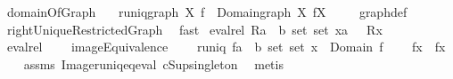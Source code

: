 \begin{isabellebody}
%
\endisadelimproof
\isanewline
{}\isamarkupfalse%
\ domainOfGraph{\isacharcolon}\ \isanewline
\ \ {\isachardoublequoteopen}runiq{\isacharparenleft}graph\ X\ f{\isacharparenright}\ {\isacharampersand}\ Domain{\isacharparenleft}graph\ X\ f{\isacharparenright}{\isacharequal}X{\isachardoublequoteclose}\ \isanewline
%
\isadelimproof
\ \ %
\endisadelimproof
%
\isatagproof
{}\isamarkupfalse%
\ graph{\isacharunderscore}def\ \isanewline
\ \ \isamarkupfalse%
\ rightUniqueRestrictedGraph\ \isamarkupfalse%
\ fast%
\endisatagproof
{\isafoldproof}%
%
\isadelimproof
\isanewline
%
\endisadelimproof
\isanewline
\isanewline
{}\isamarkupfalse%
\ {\isachardoublequoteopen}eval{\isacharunderscore}rel{}\ {\isacharparenleft}R{\isacharcolon}{\isacharcolon}{\isacharparenleft}{\isacharprime}a\ {\isasymtimes}\ {\isacharparenleft}{\isacharprime}b\ set{\isacharparenright}{\isacharparenright}\ set{\isacharparenright}\ {\isacharparenleft}x{\isacharcolon}{\isacharcolon}{\isacharprime}a{\isacharparenright}\ {\isacharequal}{\isacharequal}\ {\isasymUnion}\ {\isacharparenleft}R{\isacharbackquote}{\isacharbackquote}{\isacharbraceleft}x{\isacharbraceright}{\isacharparenright}{\isachardoublequoteclose}\isanewline
\ \ \isamarkupfalse%
\ eval{\isacharunderscore}rel{}\ {\isacharparenleft}\ {\isachardoublequoteopen}{\isacharcomma}{\isacharcomma}{\isacharcomma}{\isachardoublequoteclose}\ {}{}{\isacharparenright}\isanewline
\isanewline
{}\isamarkupfalse%
\ imageEquivalence{\isacharcolon}\ \isanewline
\ \ \ {\isachardoublequoteopen}runiq\ {\isacharparenleft}f{\isacharcolon}{\isacharcolon}{\isacharparenleft}{\isacharparenleft}{\isacharprime}a\ {\isasymtimes}\ {\isacharparenleft}{\isacharprime}b\ set{\isacharparenright}{\isacharparenright}\ set{\isacharparenright}{\isacharparenright}{\isachardoublequoteclose}\ {\isachardoublequoteopen}x\ {\isasymin}\ Domain\ f{\isachardoublequoteclose}\ \isanewline
\ \ \ {\isachardoublequoteopen}f{\isacharcomma}{\isacharcomma}x\ {\isacharequal}\ f{\isacharcomma}{\isacharcomma}{\isacharcomma}x{\isachardoublequoteclose}\isanewline
%
\isadelimproof
\ \ %
\endisadelimproof
%
\isatagproof
{}\isamarkupfalse%
\ assms\ Image{\isacharunderscore}runiq{\isacharunderscore}eq{\isacharunderscore}eval\ cSup{\isacharunderscore}singleton\ \isamarkupfalse%
\ metis%
\endisatagproof
{\isafoldproof}%
%
\isadelimproof
\isanewline

\end{isabellebody}
